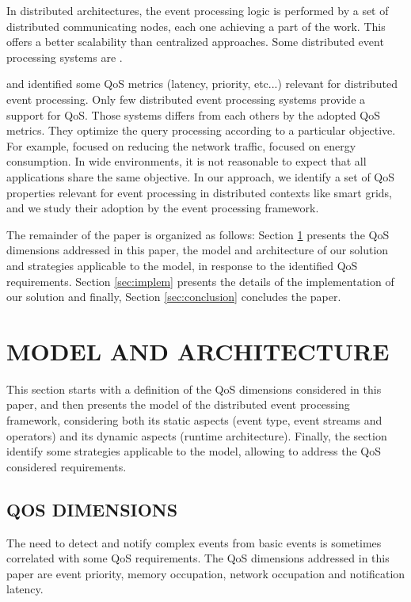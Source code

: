 \documentclass[a4paper,twoside]{article}
\begin{document}
In distributed architectures, the event processing logic is performed by a set of distributed communicating nodes, each one achieving a part of the work. This offers a better scalability than centralized approaches. Some distributed event processing systems are \cite{Cugola2009,Saleh2013,Pietzuch2003,Streambase}.

\cite{Behnel2006} and \cite{Appel2010} identified some QoS metrics (latency, priority, etc...) relevant for distributed event processing. Only few distributed event processing systems provide a support for QoS. Those systems differs from each others by the adopted QoS metrics. They optimize the query processing according to a particular objective. For example, \cite{Cugola2009} focused on reducing the network traffic, \cite{Saleh2013} focused on energy consumption. In wide environments, it is not reasonable to expect that all applications share the same objective. In our approach, we identify a set of QoS properties relevant for event processing in distributed contexts like smart grids, and we study their adoption by the event processing framework. 

The remainder of the paper is organized as follows: Section \ref{sec:model} presents the QoS dimensions addressed in this paper, the model and architecture of our solution and strategies applicable to the model, in response to the identified QoS requirements. Section \ref{sec:implem} presents the details of the implementation of our solution and finally, Section \ref{sec:conclusion} concludes the paper.
 

\section{\uppercase{Model and Architecture}}
\label{sec:model}
This section starts with a definition of the QoS dimensions considered in this paper, and then presents the model of the distributed event processing framework, considering both its static aspects (event type, event streams and operators) and its dynamic aspects (runtime architecture). Finally, the section identify some strategies applicable to the model, allowing to address the QoS considered requirements.

\subsection{\uppercase{QoS Dimensions}}
\label{sec:qos_support}
The need to detect and notify complex events from basic events is sometimes correlated with some QoS requirements. The QoS dimensions addressed in this paper are event priority, memory occupation, network occupation and notification latency. 
\end{document}

